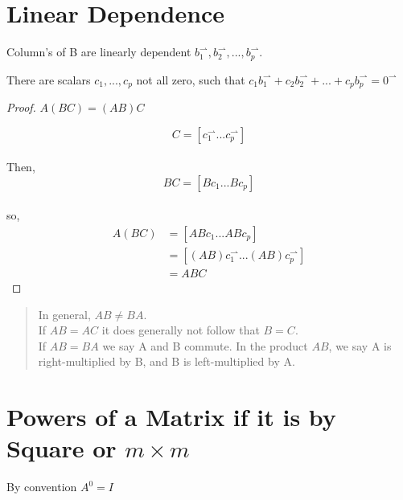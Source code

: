 \documentclass{article}
\begin{document}
\section{Linear Dependence}

Column's of B are linearly dependent $b_1^{\rightharpoonup},
b_2^{\rightharpoonup}, ..., b_p^{\rightharpoonup}$.

There are scalars $c_1, ..., c_p$ not all zero, such that
$c_1b_1^{\rightharpoonup}+c_2b_2^{\rightharpoonup}+...+c_pb_p^{\rightharpoonup}
=0^{\rightharpoonup}$

\begin{proof}
$A(BC)=(AB)C$

\[ C=[c_1^{\rightharpoonup} ... c_p^{\rightharpoonup}] \]\\
Then,\\
\[ BC=[Bc_1 ... Bc_p] \]\\
so,
\begin{align*}
A(BC) & =[ABc_1 ... ABc_p]\\
& =[(AB)c_1^{\rightharpoonup} ... (AB)c_p^{\rightharpoonup}]\\
& =ABC
\end{align*}
\end{proof}

\begin{quote}
In general, $AB\not=BA$.\\
If $AB=AC$ it does generally not follow that $B=C$.\\
If $AB=BA$ we say A and B commute. In the product $AB$, we say A is
right-multiplied by B, and B is left-multiplied by A.
\end{quote}


\section{Powers of a Matrix if it is by Square or $m{\times}m$}
By convention $A^0=I$
\end{document}
